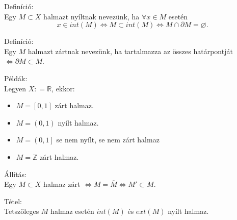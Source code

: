 \documentclass[12pt,a4paper]{scrartcl}
\providecommand{\tightlist}{%
  \setlength{\itemsep}{0pt}\setlength{\parskip}{0pt}}
\newenvironment{definicio}{}{}
\newenvironment{tetel}{}{}
\newenvironment{allitas}{}{}
\newenvironment{pelda}{}{}
\begin{document}
\begin{definicio}

Definíció:\\
Egy \(M \subset X\) halmazt nyíltnak nevezünk, ha \(\forall x \in M\)
esetén
\[\left. x \in {int}\left( M \right)\Leftrightarrow M \subset {int}\left( M \right)\Leftrightarrow M \cap \partial M = \varnothing. \right.\]

\end{definicio}

\begin{definicio}

Definíció:\\
Egy \(M\) halmazt zártnak nevezünk, ha tartalmazza az összes
határpontját \(\left. \Leftrightarrow\partial M \subset M \right.\).

\end{definicio}

\begin{pelda}

Példák:\\
Legyen \(X: = {\mathbb{R}}\), ekkor:

\begin{itemize}
\tightlist
\item
  \(M = \left\lbrack 0,1 \right\rbrack\) zárt halmaz.
\item
  \(M = \left( 0,1 \right)\) nyílt halmaz.
\item
  \(M = \left( 0,1 \right\rbrack\) se nem nyílt, se nem zárt halmaz
\item
  \(M = {\mathbb{Z}}\) zárt halmaz.
\end{itemize}

\end{pelda}

\begin{allitas}

Állítás:\\
Egy \(M \subset X\) halmaz zárt
\(\left. \Leftrightarrow M = \overline{M}\Leftrightarrow M' \subset M \right.\).

\end{allitas}

\begin{tetel}

Tétel:\\
Tetszőleges \(M\) halmaz esetén \({int}\left( M \right)\) és
\({ext}\left( M \right)\) nyílt halmaz.

\end{tetel}
\end{document}
